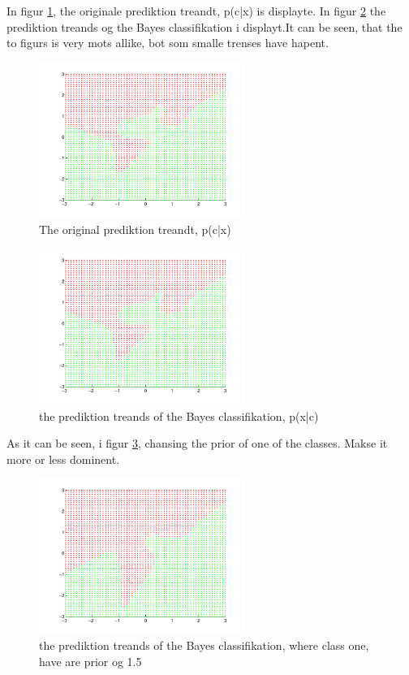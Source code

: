 In figur \ref{fig:q31}, the originale prediktion treandt, p(c|x) is
displayte. In figur \ref{fig:q32} the prediktion treands og the Bayes
classifikation i displayt.It can be seen, that the to figurs is very
mots allike, bot som smalle trenses have hapent.

\begin{figure}[!htbp]
  \centering
  \includegraphics[width=0.6\textwidth]{./images/q31.pdf}
  \caption{The original prediktion treandt, p(c|x)}
  \label{fig:q31}
\end{figure}

\begin{figure}[!htbp]
  \centering
  \includegraphics[width=0.6\textwidth]{./images/q32.pdf}
  \caption{the prediktion treands of the Bayes classifikation, p(x|c)}
  \label{fig:q32}
\end{figure}

As it can be seen, i figur \ref{fig:q33}, chansing the prior of one of
the classes. Makse it more or less dominent.

\begin{figure}[!htbp]
  \centering
  \includegraphics[width=0.6\textwidth]{./images/q33.pdf}
  \caption{the prediktion treands of the Bayes classifikation, where class one, have are prior og 1.5}
  \label{fig:q33}
\end{figure}
